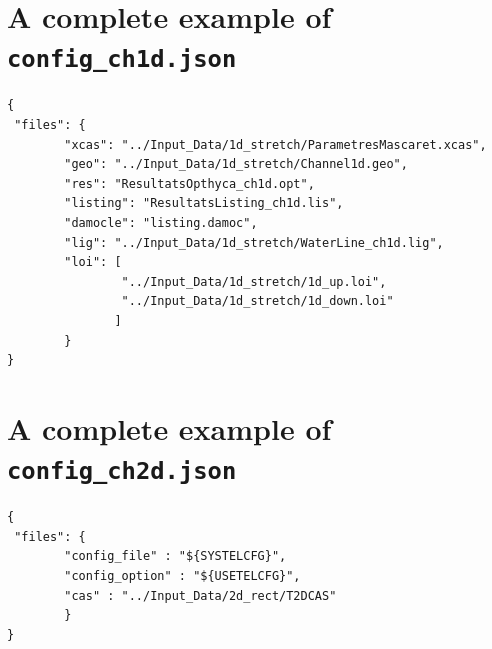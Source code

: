 \documentclass[Coupling]{../../data/TelemacDoc} %
\begin{document}
\begin{appendices}
\section{A complete example of
  \texttt{config\_ch1d.json}}\label{app:config_ch1d}

\begin{verbatim}
{
 "files": {
        "xcas": "../Input_Data/1d_stretch/ParametresMascaret.xcas",
        "geo": "../Input_Data/1d_stretch/Channel1d.geo",
        "res": "ResultatsOpthyca_ch1d.opt",
        "listing": "ResultatsListing_ch1d.lis",
        "damocle": "listing.damoc",
        "lig": "../Input_Data/1d_stretch/WaterLine_ch1d.lig",
        "loi": [
                "../Input_Data/1d_stretch/1d_up.loi",
                "../Input_Data/1d_stretch/1d_down.loi"
               ]
        }
}
\end{verbatim}

\section{A complete example of
  \texttt{config\_ch2d.json}}\label{app:config_ch2d}

\begin{verbatim}
{
 "files": {
        "config_file" : "${SYSTELCFG}",
        "config_option" : "${USETELCFG}",
        "cas" : "../Input_Data/2d_rect/T2DCAS"
        }
}
\end{verbatim}

\end{appendices}

   

\end{document}
